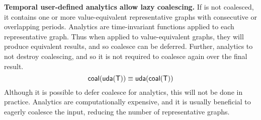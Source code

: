{\bf Temporal user-defined analytics allow lazy coalescing.} If \trg
is not coalesced, it contains one or more value-equivalent
representative graphs with consecutive or overlapping periods.
Analytics are time-invariant functions applied to each representative
graph.  Thus when applied to value-equivalent graphs, they will
produce equivalent results, and so coalesce can be deferred.  Further,
analytics to not destroy coalescing, and so it is not required to
coalesce again over the final result.  
\begin{equation}
\textsf{coal}(\textsf{uda}(\mathsf{T})) \equiv \textsf{uda}(\textsf{coal}(\mathsf{T}))
\label{rul:analytic}
\end{equation}
Although it is possible to defer coalesce for analytics, this will not
be done in practice.  Analytics are computationally expensive, and it
is usually beneficial to eagerly coalesce the input, reducing the
number of representative graphs.




